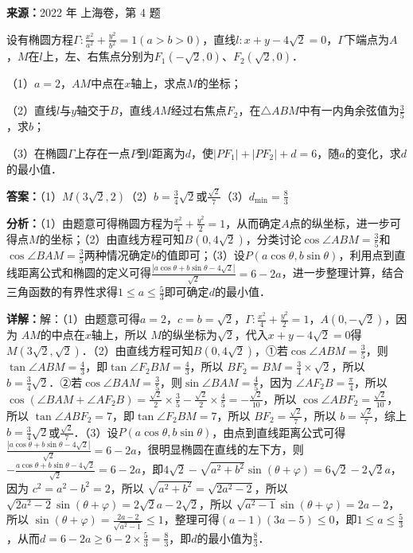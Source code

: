 \begin{question}[points=16]
\textbf{来源：}2022 年 上海卷，第 4 题\par
设有椭圆方程$\Gamma:\frac{x^2}{a^2}+\frac{y^2}{b^2}=1(a>b>0)$，直线$l:x+y-4\sqrt{2}=0$，$\Gamma$下端点为$A$，$M$在$l$上，左、右焦点分别为$F_1(-\sqrt{2},0)$、$F_2(\sqrt{2},0)$．

（1）$a=2$，$AM$中点在$x$轴上，求点$M$的坐标；

（2）直线$l$与$y$轴交于$B$，直线$AM$经过右焦点$F_2$，在$\triangle ABM$中有一内角余弦值为$\frac{3}{5}$，求$b$；

（3）在椭圆$\Gamma$上存在一点$P$到$l$距离为$d$，使$|PF_1|+|PF_2|+d=6$，随$a$的变化，求$d$的最小值．
\begin{solution}
\textbf{答案：}（1）$M(3\sqrt{2},2)$（2）$b=\frac{3}{4}\sqrt{2}$或$\frac{\sqrt{2}}{7}$（3）$d_{\min}=\frac{8}{3}$

\textbf{分析：}（1）由题意可得椭圆方程为$\frac{x^2}{4}+\frac{y^2}{2}=1$，从而确定$A$点的纵坐标，进一步可得点$M$的坐标；（2）由直线方程可知$B(0,4\sqrt{2})$，分类讨论$\cos\angle ABM=\frac{3}{5}$和$\cos\angle BAM=\frac{3}{5}$两种情况确定$b$的值即可；（3）设$P(a\cos\theta,b\sin\theta)$，利用点到直线距离公式和椭圆的定义可得$\frac{|a\cos\theta+b\sin\theta-4\sqrt{2}|}{\sqrt{2}}=6-2a$，进一步整理计算，结合三角函数的有界性求得$1\leq a\leq\frac{5}{3}$即可确定$d$的最小值．

\textbf{详解：}解：（1）由题意可得$a=2$，$c=b=\sqrt{2}$，$\Gamma:\frac{x^2}{4}+\frac{y^2}{2}=1$，$A(0,-\sqrt{2})$，因为 $AM$的中点在$x$轴上，所以 $M$的纵坐标为$\sqrt{2}$，代入$x+y-4\sqrt{2}=0$得$M(3\sqrt{2},\sqrt{2})$．（2）由直线方程可知$B(0,4\sqrt{2})$，①若$\cos\angle ABM=\frac{3}{5}$，则$\tan\angle ABM=\frac{4}{3}$，即$\tan\angle F_2BM=\frac{4}{3}$，所以 $BF_2=BM=\frac{3}{4}\times\sqrt{2}$，所以 $b=\frac{3}{4}\sqrt{2}$．②若$\cos\angle BAM=\frac{3}{5}$，则$\sin\angle BAM=\frac{4}{5}$，因为 $\angle AF_2B=\frac{\pi}{4}$，所以 $\cos(\angle BAM+\angle AF_2B)=\frac{\sqrt{2}}{2}\times\frac{3}{5}-\frac{\sqrt{2}}{2}\times\frac{4}{5}=-\frac{\sqrt{2}}{10}$，所以 $\cos\angle ABF_2=\frac{\sqrt{2}}{10}$，所以 $\tan\angle ABF_2=7$，即$\tan\angle F_2BM=7$，所以 $BF_2=\frac{\sqrt{2}}{7}$，所以 $b=\frac{\sqrt{2}}{7}$，综上$b=\frac{3}{4}\sqrt{2}$或$\frac{\sqrt{2}}{7}$．（3）设$P(a\cos\theta,b\sin\theta)$，由点到直线距离公式可得$\frac{|a\cos\theta+b\sin\theta-4\sqrt{2}|}{\sqrt{2}}=6-2a$，很明显椭圆在直线的左下方，则$-\frac{a\cos\theta+b\sin\theta-4\sqrt{2}}{\sqrt{2}}=6-2a$，即$4\sqrt{2}-\sqrt{a^2+b^2}\sin(\theta+\varphi)=6\sqrt{2}-2\sqrt{2}a$，因为 $c^2=a^2-b^2=2$，所以 $\sqrt{a^2+b^2}=\sqrt{2a^2-2}$，所以 $\sqrt{2a^2-2}\sin(\theta+\varphi)=2\sqrt{2}a-2\sqrt{2}$，所以 $\sqrt{a^2-1}\sin(\theta+\varphi)=2a-2$，所以 $\sin(\theta+\varphi)=\frac{2a-2}{\sqrt{a^2-1}}\leq1$，整理可得$(a-1)(3a-5)\leq0$，即$1\leq a\leq\frac{5}{3}$，从而$d=6-2a\geq6-2\times\frac{5}{3}=\frac{8}{3}$，即$d$的最小值为$\frac{8}{3}$．
\end{solution}
\end{question}

